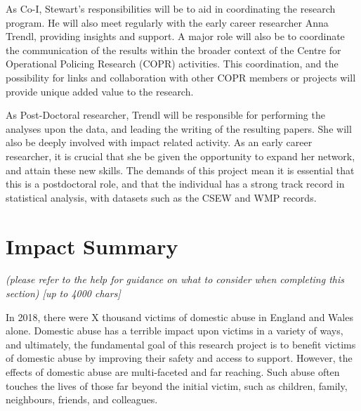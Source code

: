 \documentclass[11pt, a4paper]{article}
\begin{document}
As Co-I, Stewart's responsibilities will be to aid in coordinating the research program. He will also meet regularly with the early career researcher Anna Trendl, providing insights and support. A major role will also be to coordinate the communication of the results within the broader context of the Centre for Operational Policing Research (COPR) activities. This coordination, and the possibility for links and collaboration with other COPR members or projects will provide unique added value to the research. 

As Post-Doctoral researcher, Trendl will be responsible for performing the analyses upon the data, and leading the writing of the resulting papers. She will also be deeply involved with impact related activity. As an early career researcher, it is crucial that she be given the opportunity to expand her network, and attain these new skills. The demands of this project mean it is essential that this is a postdoctoral role, and that the individual has a strong track record in statistical analysis, with datasets such as the CSEW and WMP records. 



\section{Impact Summary }

%
%
%
%
%
%
%
%



\textit{(please refer to the help for guidance on what to consider when completing this section) [up to 4000 chars]}

In 2018, there were X thousand victims of domestic abuse in England and Wales alone. Domestic abuse has a terrible impact upon victims in a variety of ways, and ultimately, the fundamental goal of this research project is to benefit victims of domestic abuse by improving their safety and access to support. However, the effects of domestic abuse are multi-faceted and far reaching. Such abuse often touches the lives of those far beyond the initial victim, such as children, family, neighbours, friends, and colleagues. 
\end{document}

